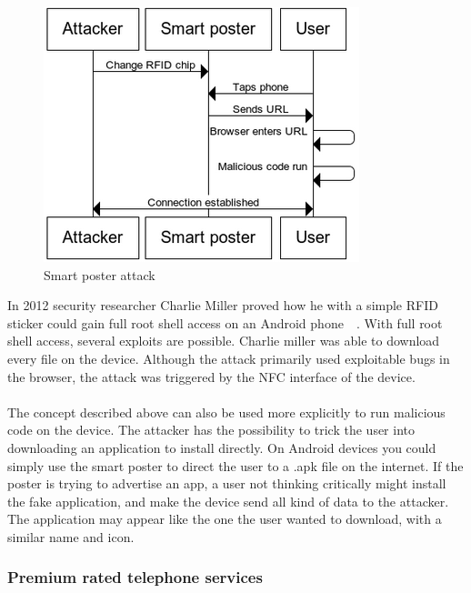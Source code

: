 \documentclass[a4paper,11pt]{article}
\begin{document}
\begin{figure}
  \vspace{0cm}
  \centering
  \vspace{-1cm}
  \includegraphics[scale=0.5]{SD_SmartPoster1} %
  \vspace{-0.4cm}
  \caption{Smart poster attack
  \label{fig:SD_SmartPoster1}}
\end{figure}
In 2012 security researcher Charlie Miller proved how he with a simple RFID sticker could gain full root shell access on an Android phone~\cite{cmiller}~\cite{cmiller1}. With full root shell access, several exploits are possible. Charlie miller was able to download every file on the device. Although the attack primarily used exploitable bugs in the browser, the attack was triggered by the NFC interface of the device.

\paragraph{}
The concept described above can also be used more explicitly to run malicious code on the device. The attacker has the possibility to trick the user into downloading an application to install directly. On Android devices you could simply use the smart poster to direct the user to a .apk file on the internet. If the poster is trying to advertise an app, a user not thinking critically might install the fake application, and make the device send all kind of data to the attacker. The application may appear like the one the user wanted to download, with a similar name and icon.

\subsubsection{Premium rated telephone services}
\end{document}
